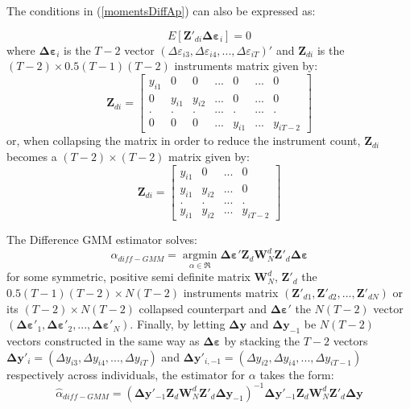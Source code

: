 \documentclass[a4paper, 12pt]{article}
\begin{document}
The conditions in (\ref{momentsDiffAp}) can also be expressed as:

\begin{equation*}
E\left[ \mathbf{Z}'_{di}\mathbf{\Delta \varepsilon}_{i}\right]=0
\end{equation*}
where $\mathbf{\Delta \varepsilon}_{i}$ is the $T-2$ vector $(\Delta \varepsilon_{i3},\Delta \varepsilon_{i4},...,\Delta \varepsilon_{iT})'$ and $\mathbf{Z}_{di}$ is the $(T-2)\times 0.5(T-1)(T-2)$ instruments matrix given by:
\[
\mathbf{Z}_{di} = \left[ {\begin{array}{*{20}{c}}
{{y_{i1}}}&0&0&{...}&0&{...}&0\\
0&{{y_{i1}}}&{{y_{i2}}}&{...}&0&{...}&0\\
.&.&.&{...}&.&{...}&.\\
0&0&0&{...}&{{y_{i1}}}&{...}&{{y_{iT - 2}}}
\end{array}} \right]
\]
or, when collapsing the matrix in order to reduce the instrument count, $\mathbf{Z}_{di}$ becomes a $(T-2)\times (T-2)$ matrix given by:
\[
\mathbf{Z}_{di} = \left[ {\begin{array}{*{20}{c}}
{{y_{i1}}}&0&{...}&0\\
{{y_{i1}}}&{{y_{i2}}}&{...}&0\\
.&.&{...}&.\\
{{y_{i1}}}&{{y_{i2}}}&{...}&{{y_{iT - 2}}}
\end{array}} \right]
\]

The Difference GMM estimator solves:
\[
{{\hat \alpha }_{diff - GMM}} = \mathop {\arg \min }\limits_{\alpha  \in \Re } \mathbf{\Delta \varepsilon}' \mathbf{Z}_{d}{\mathbf{W}_{N}^d}\mathbf{Z}'_{d}\mathbf{\Delta \varepsilon} 
\]
for some symmetric, positive semi definite matrix $\mathbf{W}_{N}^d$, $\mathbf{Z}'_{d}$ the $0.5(T-1)(T-2)\times N(T-2)$ instruments matrix $(\mathbf{Z}'_{d1},\mathbf{Z}'_{d2},...,\mathbf{Z}'_{dN})$ or its $(T-2)\times N(T-2)$ collapsed counterpart and $\mathbf{\Delta \varepsilon}'$ the $N(T-2)$ vector $(\mathbf{\Delta \varepsilon}'_1,\mathbf{\Delta \varepsilon}'_2,...,\mathbf{\Delta \varepsilon}'_N)$. Finally, by letting $\mathbf{\Delta y}$ and $\mathbf{\Delta y}_{-1}$ be $N(T-2)$ vectors constructed in the same way as $\mathbf{\Delta \varepsilon}$ by stacking the $T-2$ vectors $\mathbf{\Delta y}'_i=(\Delta y_{i3},\Delta y_{i4},...,\Delta y_{iT})$ and $\mathbf{\Delta y}'_{i,-1}=(\Delta y_{i2},\Delta y_{i4},...,\Delta y_{iT-1})$ respectively across individuals, the estimator for $\alpha$ takes the form:
\[
{{\hat \alpha }_{diff - GMM}} = {\left( \mathbf{\Delta y}'_{-1}\mathbf{Z}_d \mathbf{W}_{N}^d \mathbf{Z}'_d \mathbf{\Delta y}_{-1} \right)^{ - 1}} \mathbf{\Delta y}'_{-1}\mathbf{Z}_d \mathbf{W}_{N}^d \mathbf{Z}'_d \mathbf{\Delta y} 
\]
\end{document}
